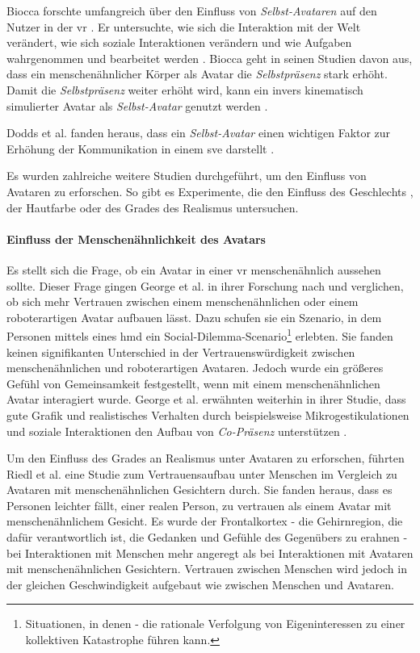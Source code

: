 \documentclass[a4paper,11pt]{article}%
\renewcommand{\\}{\vspace*{0.5\baselineskip} \newline}
\begin{document}
Biocca forschte umfangreich über den Einfluss von \textit{Selbst-Avataren} auf den Nutzer in der \ac{vr} \citep[421-427]{construal2014connected}. Er untersuchte, wie sich die Interaktion mit der Welt verändert, wie sich soziale Interaktionen verändern und wie Aufgaben wahrgenommen und bearbeitet werden \citep{benford1995user} \citep{bowers1996talk}.
Biocca geht in seinen Studien davon aus, dass ein menschenähnlicher Körper als Avatar die \textit{Selbstpräsenz} stark erhöht. Damit die \textit{Selbstpräsenz} weiter erhöht wird, kann ein invers kinematisch simulierter Avatar als \textit{Selbst-Avatar} genutzt werden \citep[421-427]{construal2014connected}.

Dodds et al. fanden heraus, dass ein \textit{Selbst-Avatar} einen wichtigen Faktor zur Erhöhung der Kommunikation in einem \ac{sve} darstellt \citep[1-11]{dodds2011talk}.

Es wurden zahlreiche weitere Studien durchgeführt, um den Einfluss von Avataren zu erforschen. So gibt es Experimente, die den Einfluss des Geschlechts \citep{slater2010first}, der Hautfarbe \citep{peck2013putting} oder des Grades des Realismus \citep{roth2016avatar} untersuchen.

\label{AvatarTrust}
\paragraph{Einfluss der Menschenähnlichkeit des Avatars}
Es stellt sich die Frage, ob ein Avatar in einer \ac{vr} menschenähnlich aussehen sollte. Dieser Frage gingen George et al. \citep{george2018trusting} in ihrer Forschung nach und verglichen, ob sich mehr Vertrauen zwischen einem menschenähnlichen oder einem roboterartigen Avatar aufbauen lässt.
Dazu schufen sie ein Szenario, in dem Personen mittels eines \ac{hmd} ein Social-Dilemma-Scenario\footnote{Situationen, in denen - die rationale Verfolgung von Eigeninteressen zu einer kollektiven Katastrophe führen kann.} erlebten. Sie fanden keinen signifikanten Unterschied in der Vertrauenswürdigkeit zwischen menschenähnlichen und roboterartigen Avataren. Jedoch wurde ein größeres Gefühl von Gemeinsamkeit festgestellt, wenn mit einem menschenähnlichen Avatar interagiert wurde.
George et al. erwähnten weiterhin in ihrer Studie, dass gute Grafik und realistisches Verhalten durch beispielsweise Mikrogestikulationen und soziale Interaktionen den Aufbau von \textit{Co-Präsenz} unterstützen \citep{george2018trusting}.

Um den Einfluss des Grades an Realismus unter Avataren zu erforschen, führten Riedl et al. \citep{riedl2014trusting} eine Studie zum Vertrauensaufbau unter Menschen im Vergleich zu Avataren mit menschenähnlichen Gesichtern durch. Sie fanden heraus, dass es Personen leichter fällt, einer realen Person, zu vertrauen als einem Avatar mit menschenähnlichem Gesicht. Es wurde der Frontalkortex - die Gehirnregion, die dafür verantwortlich ist, die Gedanken und Gefühle des Gegenübers zu erahnen - bei Interaktionen mit Menschen mehr angeregt als bei Interaktionen mit Avataren mit menschenähnlichen Gesichtern.
Vertrauen zwischen Menschen wird jedoch in der gleichen Geschwindigkeit aufgebaut wie zwischen Menschen und Avataren.
\end{document}
